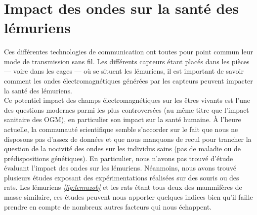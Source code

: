 \section{Impact des ondes sur la santé des lémuriens} %

    \paragraph{}Ces différentes technologies de communication ont toutes pour point commun leur mode de transmission sans fil. Les différents capteurs étant placés dans les pièces --- voire dans les cages --- où se situent les lémuriens, il est important de savoir comment les ondes électromagnétiques générées par les capteurs peuvent impacter la santé des lémuriens.\\
    Ce potentiel impact des champs électromagnétiques sur les êtres vivants est l'une des questions modernes parmi les plus controversées \cite{INRS} (au même titre que l'impact sanitaire des OGM), en particulier son impact sur la santé humaine. À l'heure actuelle, la communauté scientifique semble s'accorder sur le fait que nous ne disposons pas d'assez de données et que nous manquons de recul pour trancher la question de la nocivité des ondes sur les individus sains (pas de maladie ou de prédispositions génétiques). En particulier, nous n'avons pas trouvé d'étude évaluant l'impact des ondes sur les lémuriens. Néanmoins, nous avons trouvé plusieurs études exposant des expérimentations réalisées sur des souris ou des rats. Les lémuriens \textit{\ref{fig:lemuzob}} et les rats étant tous deux des mammifères de masse similaire, ces études peuvent nous apporter quelques indices bien qu'il faille prendre en compte de nombreux autres facteurs qui nous échappent.
   
